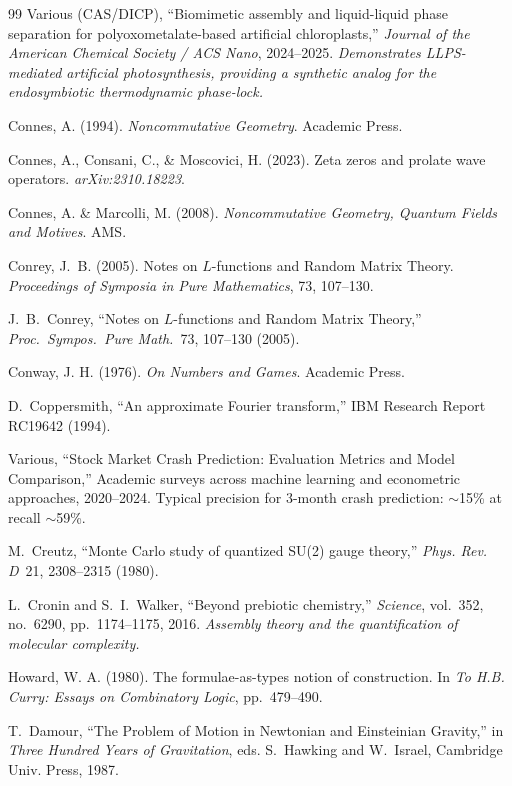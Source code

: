 \documentclass[12pt,oneside]{book}
\theoremstyle{principia}
\theoremstyle{definition}
\theoremstyle{remark}
\begin{document}
\begin{thebibliography}{99}
Various (CAS/DICP),
``Biomimetic assembly and liquid-liquid phase separation for polyoxometalate-based artificial chloroplasts,''
\emph{Journal of the American Chemical Society / ACS Nano}, 2024--2025.
\textit{Demonstrates LLPS-mediated artificial photosynthesis, providing a synthetic analog for the endosymbiotic thermodynamic phase-lock.}

Connes, A. (1994). \emph{Noncommutative Geometry}. Academic Press.

Connes, A., Consani, C., \& Moscovici, H. (2023). Zeta zeros and prolate wave operators. \emph{arXiv:2310.18223}.

Connes, A. \& Marcolli, M. (2008). \emph{Noncommutative Geometry, Quantum Fields and Motives}. AMS.

Conrey, J.~B. (2005).
Notes on $L$-functions and Random Matrix Theory.
\emph{Proceedings of Symposia in Pure Mathematics}, 73, 107--130.

J.~B.~Conrey, ``Notes on $L$-functions and Random Matrix Theory,'' \emph{Proc.\ Sympos.\ Pure Math.}\ 73, 107--130 (2005).

Conway, J. H. (1976). \emph{On Numbers and Games}. Academic Press.

D.~Coppersmith,
``An approximate Fourier transform,''
IBM Research Report RC19642 (1994).

Various,
``Stock Market Crash Prediction: Evaluation Metrics and Model Comparison,''
Academic surveys across machine learning and econometric approaches, 2020--2024.
Typical precision for 3-month crash prediction: $\sim$15\% at recall $\sim$59\%.

M.~Creutz,
``Monte Carlo study of quantized SU(2) gauge theory,''
\emph{Phys. Rev. D}\ 21, 2308--2315 (1980).

L.~Cronin and S.~I.~Walker,
``Beyond prebiotic chemistry,''
\emph{Science}, vol.~352, no.~6290, pp.~1174--1175, 2016.
\textit{Assembly theory and the quantification of molecular complexity.}

Howard, W. A. (1980). The formulae-as-types notion of construction. In \emph{To H.B. Curry: Essays on Combinatory Logic}, pp.~479--490.

T.~Damour, ``The Problem of Motion in Newtonian and Einsteinian Gravity,'' in \emph{Three Hundred Years of Gravitation}, eds. S.~Hawking and W.~Israel, Cambridge Univ. Press, 1987.


\end{thebibliography}
\end{document}
